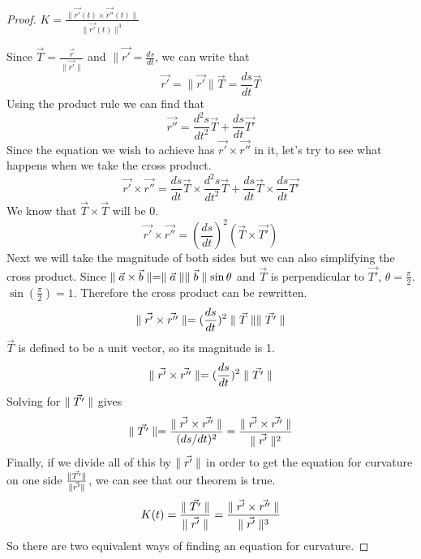 \documentclass[12 pt]{article}
\begin{document}
        \begin{proof}
            $K=\frac{\parallel\vec{r'}(t)\times\vec{r''}(t)\parallel}{\parallel\vec{r'}(t)\parallel^3}$

            Since $\vec{T}=\frac{\vec{r}}{\parallel\vec{r'}\parallel}$ and $\parallel\vec{r'}=\frac{ds}{dt}$, we can write that
            $$\vec{r'}=\parallel\vec{r'}\parallel\vec{T}=\frac{ds}{dt}\vec{T}$$
            Using the product rule we can find that
            $$\vec{r''}=\frac{d^2s}{dt^2}\vec{T}+\frac{ds}{dt}\vec{T'}$$
            Since the equation we wish to achieve has $\vec{r'}\times\vec{r''}$ in it, let's try to see what happens when we take the cross product.
            $$\vec{r'}\times\vec{r''}=\frac{ds}{dt}\vec{T}\times\frac{d^2s}{dt^2}\vec{T}+\frac{ds}{dt}\vec{T}\times\frac{ds}{dt}\vec{T'}$$
            We know that $\vec{T}\times\vec{T}$ will be 0.
            $$\vec{r'}\times\vec{r''}=(\frac{ds}{dt})^2(\vec{T}\times\vec{T'})$$
            Next we will take the magnitude of both sides but we can also simplifying the cross product. Since $\parallel \vec{a}\times\vec{b}\parallel=\parallel \vec{a} \parallel\parallel \vec{b} \parallel\sin{\theta}$ and $\vec{T}$ is perpendicular to $\vec{T'}$, $\theta=\frac{\pi}{2}$. $\sin(\frac{\pi}{2})=1$. Therefore the cross product can be rewritten.
            $$\parallel\vec{r'}\times\vec{r''}\parallel=(\frac{ds}{dt})^2\parallel \vec{T} \parallel\parallel \vec{T'} \parallel$$
            $\vec{T}$ is defined to be a unit vector, so its magnitude is 1.
            $$\parallel\vec{r'}\times\vec{r''}\parallel=(\frac{ds}{dt})^2\parallel \vec{T'} \parallel$$
            Solving for $\parallel \vec{T'} \parallel$ gives
            $$\parallel \vec{T'} \parallel=\frac{\parallel\vec{r'}\times\vec{r''}\parallel}{(ds/dt)^2}=\frac{\parallel\vec{r'}\times\vec{r''}\parallel}{\parallel \vec{r'} \parallel^2}$$
            Finally, if we divide all of this by $\parallel \vec{r'} \parallel$ in order to get the equation for curvature on one side $\frac{\parallel \vec{T'} \parallel}{\parallel \vec{r'} \parallel}$, we can see that our theorem is true.
            $$K(t)=\frac{\parallel \vec{T'} \parallel}{\parallel \vec{r'} \parallel}=\frac{\parallel\vec{r'}\times\vec{r''}\parallel}{\parallel \vec{r'} \parallel^3}$$
            So there are two equivalent ways of finding an equation for curvature.
        \end{proof}
\end{document}
